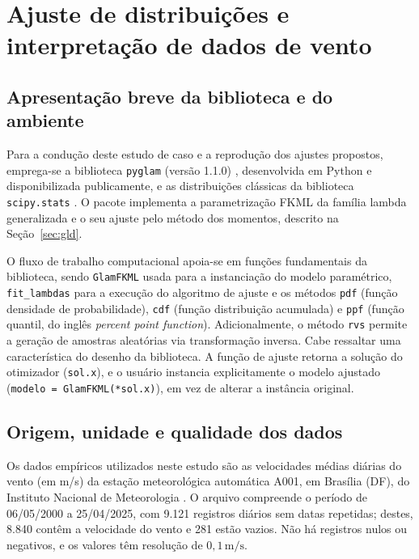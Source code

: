 \section{Ajuste de distribuições e interpretação de dados de vento}\label{sec:vento}

\subsection{Apresentação breve da biblioteca e do ambiente}

Para a condução deste estudo de caso e a reprodução dos ajustes propostos, emprega-se a biblioteca \texttt{pyglam} (versão 1.1.0) \parencite{pyglam}, desenvolvida em Python e disponibilizada publicamente, e as distribuições clássicas da biblioteca \texttt{scipy.stats} \parencite{scipy2020}. O pacote implementa a parametrização FKML da família lambda generalizada e o seu ajuste pelo método dos momentos, descrito na Seção~\ref{sec:gld}.

O fluxo de trabalho computacional apoia-se em funções fundamentais da biblioteca, sendo \texttt{GlamFKML} usada para a instanciação do modelo paramétrico, \texttt{fit\_lambdas} para a execução do algoritmo de ajuste e os métodos \texttt{pdf} (função densidade de probabilidade), \texttt{cdf} (função distribuição acumulada) e \texttt{ppf} (função quantil, do inglês \textit{percent point function}). Adicionalmente, o método \texttt{rvs} permite a geração de amostras aleatórias via transformação inversa. Cabe ressaltar uma característica do desenho da biblioteca. A função de ajuste retorna a solução do otimizador (\texttt{sol.x}), e o usuário instancia explicitamente o modelo ajustado (\texttt{modelo = GlamFKML(*sol.x)}), em vez de alterar a instância original.

\subsection{Origem, unidade e qualidade dos dados}

Os dados empíricos utilizados neste estudo são as velocidades médias diárias do vento (em m/s) da estação meteorológica automática A001, em Brasília (DF), do Instituto Nacional de Meteorologia \parencite{inmet2025}. O arquivo compreende o período de 06/05/2000 a 25/04/2025, com 9.121 registros diários sem datas repetidas; destes, 8.840 contêm a velocidade do vento e 281 estão vazios. Não há registros nulos ou negativos, e os valores têm resolução de $0,1\,\text{m/s}$.

